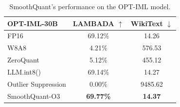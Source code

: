 \begin{table}
\setlength{\tabcolsep}{2.5pt}
\small
\centering
\caption{SmoothQuant's performance on the OPT-IML model.
}
\label{tab:opt-iml}
\begin{tabular}{lcc}
\toprule
OPT-IML-30B        & LAMBADA $\uparrow$ & WikiText $\downarrow$  \\
\midrule
FP16               & 69.12\%                     & 14.26                           \\
\midrule
W8A8               & 4.21\%                      & 576.53                          \\
ZeroQuant          & 5.12\%                      & 455.12                          \\
LLM.int8()         & 69.14\%                     & 14.27                           \\
Outlier Suppression & 0.00\%                      & 9485.62                         \\
\midrule
SmoothQuant-O3     &\textbf{ 69.77\%}                     & \textbf{14.37}\\
\bottomrule
\end{tabular}
\end{table}
